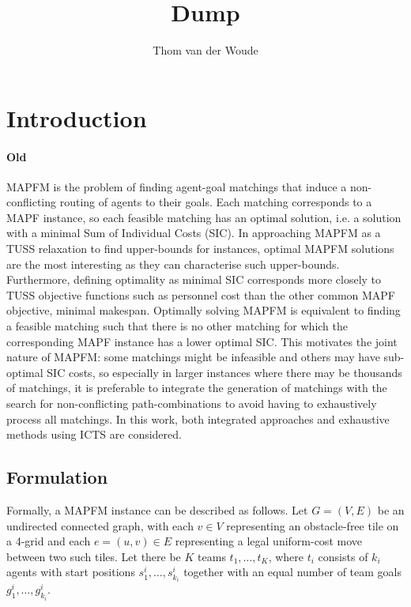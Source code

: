 \documentclass[english]{article}
\begin{document}
	
	\title{Dump}
	
	\author{Thom van der Woude}
	\date{}
	
	\maketitle

	\section{Introduction}
		
	\paragraph{Old}
	MAPFM is the problem of finding agent-goal matchings that induce a non-conflicting routing of agents to their goals. Each matching corresponds to a MAPF instance, so each feasible matching has an optimal solution, i.e. a solution with a minimal Sum of Individual Costs (SIC). In approaching MAPFM as a TUSS relaxation to find upper-bounds for instances, optimal MAPFM solutions are the most interesting as they can characterise such upper-bounds. Furthermore, defining optimality as minimal SIC corresponds more closely to TUSS objective functions such as personnel cost than the other common MAPF objective, minimal makespan. Optimally solving MAPFM is equivalent to finding a feasible matching such that there is no other matching for which the corresponding MAPF instance has a lower optimal SIC. This motivates the joint nature of MAPFM: some matchings might be infeasible and others may have sub-optimal SIC costs, so especially in larger instances where there may be thousands of matchings, it is preferable to integrate the generation of matchings with the search for non-conflicting path-combinations to avoid having to exhaustively process all matchings. In this work, both integrated approaches and exhaustive methods using ICTS are considered.
		
	\subsection{Formulation}
	Formally, a MAPFM instance can be described as follows. Let $G = (V,E)$ be an undirected connected graph, with each $v\in V$ representing an obstacle-free tile on a 4-grid and each $e = (u,v)\in E$ representing a legal uniform-cost move between two such tiles. Let there be $K$ teams $t_1,\ldots, t_K$, where $t_i$ consists of $k_i$ agents with start positions $s_1^i,\ldots,s_{k_i}^i$ together with an equal number of team goals $g_1^i,\ldots,g_{k_i}^i$. 
	
\end{document}
